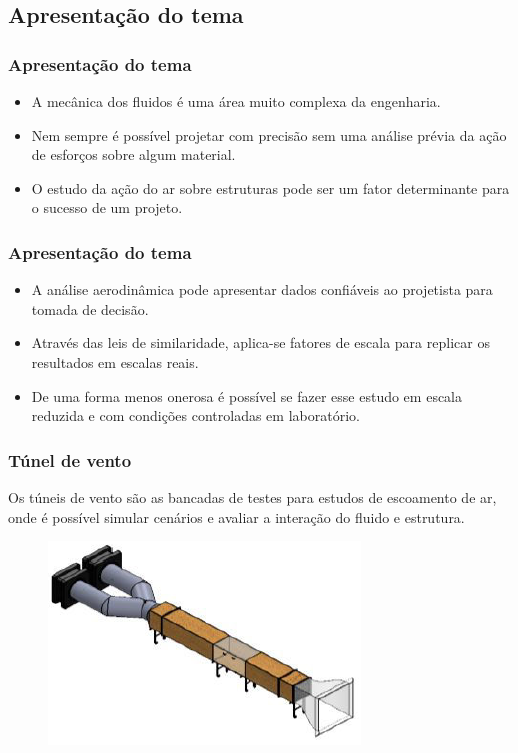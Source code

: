 \subsection{Apresentação do tema}
\begin{frame}
\frametitle{Apresentação do tema}
\begin{itemize}
    \item A mecânica dos fluidos é uma área muito complexa da engenharia.
    \item Nem sempre é possível  projetar com precisão sem uma análise prévia da ação de esforços sobre algum material. 
    \item O estudo da ação do ar sobre estruturas pode ser um fator determinante para o sucesso de um projeto. 
\end{itemize}
\end{frame}

\begin{frame}
\frametitle{Apresentação do tema}
\begin{itemize}
    \item A análise aerodinâmica pode apresentar dados confiáveis ao projetista para tomada de decisão. 
    \item Através das leis de similaridade, aplica-se fatores de escala para replicar os resultados em escalas reais. 
    \item De uma forma menos onerosa é possível se fazer esse estudo em escala reduzida e com condições controladas em laboratório.
\end{itemize}
\end{frame}

\begin{frame}
\frametitle{Túnel de vento}

Os túneis de vento são as bancadas de testes para estudos de escoamento de ar, onde é possível simular cenários e avaliar a interação do fluido e estrutura.

\begin{figure}
\centering
\includegraphics[scale = 1]{figs/tuneldevento}
\end{figure}

\end{frame}
 
